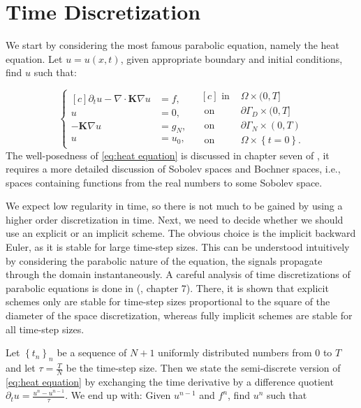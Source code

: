 \documentclass[../Main/main.tex]{subfiles}
\begin{document}
	\section{Time Discretization}	
		We start by considering the most famous parabolic equation, namely the heat equation. Let $u = u(x,t)$, given appropriate boundary and initial conditions, find $u$ such that:
	
	\begin{equation}\label{eq:heat equation}
		\left \{
		\begin{aligned}[c]
			\partial_t u - \nabla \cdot \bm{K} \nabla u &= f, \\
			u &= 0, \\
			-\bm{K}\nabla u &= g_N,\\
			u &= u_0,
		\end{aligned}
		\ \ \
		\begin{aligned}[c]
			\text{ in }& \Omega \times (0,T]\\
			\text{ on }& \partial \Gamma_D \times (0,T]\\
			\text{ on }& \partial \Gamma_N \times (0,T)\\
			\text{ on }& \Omega \times \left\{t=0\right \}.
		\end{aligned}
	\right.
	\end{equation}
	The well-posedness of \eqref{eq:heat equation} is discussed in chapter seven of \cite{evans10}, it requires a more detailed discussion of Sobolev spaces and Bochner spaces, i.e., spaces containing functions from the real numbers to some Sobolev space.\par
	We expect low regularity in time, so there is not much to be  gained by using a higher order discretization in time. Next, we need to decide whether we should use an explicit or an implicit scheme. The obvious choice is the implicit backward Euler, as it is stable for large time-step sizes. This can be understood intuitively by considering the parabolic nature of the equation, the signals propagate through the domain instantaneously. A careful analysis of time discretizations of parabolic equations is done in (\cite{Knabner}, chapter 7).  There, it is shown that explicit schemes only are stable for time-step sizes proportional to the square of the diameter of the space discretization, whereas fully implicit schemes are stable for all time-step sizes. \par  Let $\left \{ t_n \right \}_n$ be a sequence of $N+1$ uniformly distributed numbers from $0$ to $T$ and let $\tau = \frac{T}{N}$ be the time-step size. Then we state the semi-discrete version of \eqref{eq:heat equation} by exchanging the time derivative by a difference quotient $\partial_t u = \frac{u^n-u^{n-1}}{\tau}$. We end up with: Given $u^{n-1}$ and $f^n$, find $u^n$ such that
\end{document}

